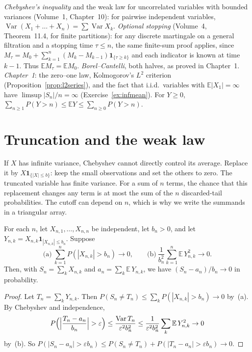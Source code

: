 \begin{reminder}
\emph{Chebyshev's inequality} and the weak law for uncorrelated variables with bounded variances (Volume~1, Chapter~10): for pairwise independent
variables, $\operatorname{Var}(X_1+\dots+X_n)=\sum\operatorname{Var}X_k$. \emph{Optional stopping} (Volume~4, Theorem~11.4, for finite partitions): for any discrete martingale on a general filtration and a stopping time $\tau\le n$, the same finite-sum proof applies, since
$M_\tau=M_0+\sum_{k=1}^n(M_k-M_{k-1})\mathbf1_{\{\tau\ge k\}}$ and each indicator is known at time $k-1$. Thus $\mathbb E M_\tau=\mathbb E M_0$. \emph{Borel--Cantelli}, both halves, as proved in Chapter~1. \emph{Chapter~1}: the zero--one law,
Kolmogorov's $L^2$ criterion (Proposition~\ref{prop:l2series}), and the fact that i.i.d.\ variables with
$\mathbb E|X_1|=\infty$ have $\limsup|S_n|/n=\infty$ (Exercise~\ref{ex:infmean}). For $Y\ge0$, $\sum_{n\ge1}P(Y>n)\le\mathbb E Y\le\sum_{n\ge0}P(Y>n)$.
\end{reminder}

\section{Truncation and the weak law}

If $X$ has infinite variance, Chebyshev cannot directly control its average. Replace it by $X\mathbf1_{\{|X|\le b\}}$: keep the small observations and set the others to zero. The truncated variable has finite variance. For a sum of $n$ terms, the chance that this replacement changes any term is at most the sum of the $n$ discarded-tail probabilities. The cutoff can depend on $n$, which is why we write the summands in a triangular array.

\begin{theorem}\label{thm:wlltriangular}
For each $n$, let $X_{n,1},\dots,X_{n,n}$ be independent, let $b_n>0$, and let $Y_{n,k}=X_{n,k}\mathbf 1_{|X_{n,k}|\le b_n}$. Suppose
\[
\text{(a)}\ \sum_{k=1}^nP(|X_{n,k}|>b_n)\to0,\qquad\text{(b)}\ \frac1{b_n^2}\sum_{k=1}^n\mathbb E\,Y_{n,k}^2\to0.
\]
Then, with $S_n=\sum_kX_{n,k}$ and $a_n=\sum_k\mathbb E\,Y_{n,k}$, we have $(S_n-a_n)/b_n\to0$ in probability.
\end{theorem}
\begin{proof}
Let $T_n=\sum_kY_{n,k}$. Then $P(S_n\ne T_n)\le\sum_kP(|X_{n,k}|>b_n)\to0$ by~(a). By Chebyshev and independence,
\[
P\Bigl(\Bigl|\frac{T_n-a_n}{b_n}\Bigr|>\varepsilon\Bigr)\le\frac{\operatorname{Var}T_n}{\varepsilon^2b_n^2}\le\frac1{\varepsilon^2b_n^2}\sum_k\mathbb E\,Y_{n,k}^2\to0
\]
by~(b). So $P(|S_n-a_n|>\varepsilon b_n)\le P(S_n\ne T_n)+P(|T_n-a_n|>\varepsilon b_n)\to0$.
\end{proof}

